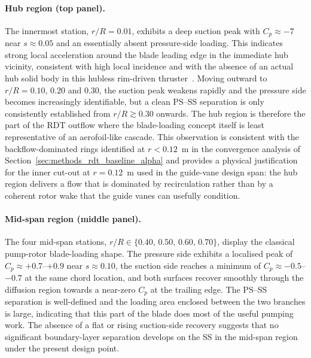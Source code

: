 \paragraph{Hub region (top panel).}
The innermost station, $r/R=0.01$, exhibits a deep suction peak with
$C_p\approx -7$ near $s\approx 0.05$ and an essentially absent
pressure-side loading. This indicates strong local acceleration around
the blade leading edge in the immediate hub vicinity, consistent with
high local incidence and with the absence of an actual hub solid body
in this hubless rim-driven thruster~\cite{Verdijck2025}. Moving outward
to $r/R=0.10,\,0.20$ and $0.30$, the suction peak weakens rapidly and
the pressure side becomes increasingly identifiable, but a clean
PS--SS separation is only consistently established from
$r/R\gtrsim 0.30$ onwards. The hub region is therefore the part of the
RDT outflow where the blade-loading concept itself is least
representative of an aerofoil-like cascade. This observation is
consistent with the backflow-dominated rings identified at
$r<0.12$~m in the convergence analysis of
Section~\ref{sec:methods_rdt_baseline_alpha} and provides a physical
justification for the inner cut-out at $r=0.12$~m used in the
guide-vane design span: the hub region delivers a flow that is
dominated by recirculation rather than by a coherent rotor wake that
the guide vanes can usefully condition.
 
\paragraph{Mid-span region (middle panel).}
The four mid-span stations, $r/R\in\{0.40,\,0.50,\,0.60,\,0.70\}$,
display the classical pump-rotor blade-loading shape. The pressure side
exhibits a localised peak of $C_p\approx +0.7$--$+0.9$ near
$s\approx 0.10$, the suction side reaches a minimum of
$C_p\approx -0.5$--$-0.7$ at the same chord location, and both surfaces
recover smoothly through the diffusion region towards a near-zero
$C_p$ at the trailing edge. The PS--SS separation is well-defined and
the loading area enclosed between the two branches is large, indicating
that this part of the blade does most of the useful pumping work. The
absence of a flat or rising suction-side recovery suggests that no
significant boundary-layer separation develops on the SS in the
mid-span region under the present design point.
 
